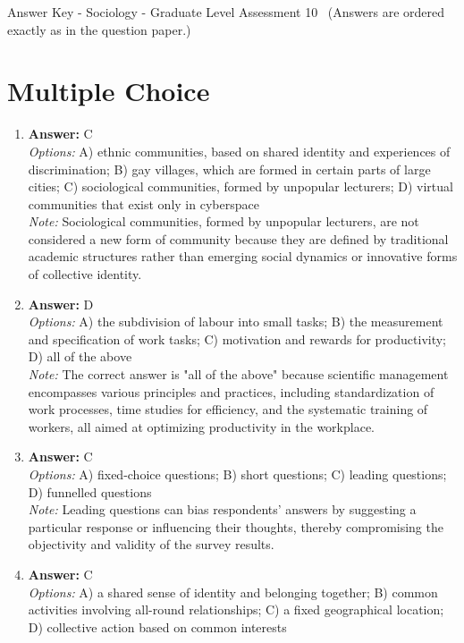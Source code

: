 \documentclass[12pt]{article}
\begin{document}
\begin{center}
Answer Key - Sociology - Graduate Level Assessment 10 \
\small (Answers are ordered exactly as in the question paper.)
\end{center}

\section*{Multiple Choice}
\begin{enumerate}[label=\arabic*.]
\item \textbf{Answer:} C
\\ \textit{Options:} A) ethnic communities, based on shared identity and experiences of discrimination; B) gay villages, which are formed in certain parts of large cities; C) sociological communities, formed by unpopular lecturers; D) virtual communities that exist only in cyberspace
\\ \textit{Note:} Sociological communities, formed by unpopular lecturers, are not considered a new form of community because they are defined by traditional academic structures rather than emerging social dynamics or innovative forms of collective identity.
\item \textbf{Answer:} D
\\ \textit{Options:} A) the subdivision of labour into small tasks; B) the measurement and specification of work tasks; C) motivation and rewards for productivity; D) all of the above
\\ \textit{Note:} The correct answer is "all of the above" because scientific management encompasses various principles and practices, including standardization of work processes, time studies for efficiency, and the systematic training of workers, all aimed at optimizing productivity in the workplace.
\item \textbf{Answer:} C
\\ \textit{Options:} A) fixed-choice questions; B) short questions; C) leading questions; D) funnelled questions
\\ \textit{Note:} Leading questions can bias respondents' answers by suggesting a particular response or influencing their thoughts, thereby compromising the objectivity and validity of the survey results.
\item \textbf{Answer:} C
\\ \textit{Options:} A) a shared sense of identity and belonging together; B) common activities involving all-round relationships; C) a fixed geographical location; D) collective action based on common interests

\end{enumerate}
\end{document}
